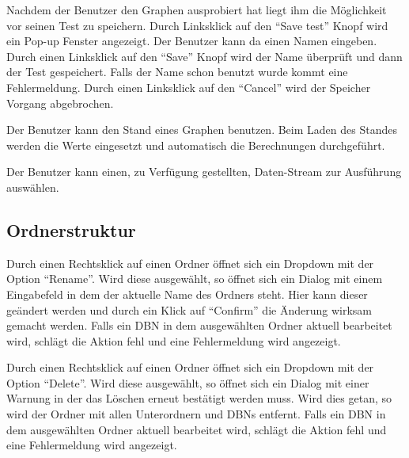\documentclass[parskip=full,11pt,twoside]{scrartcl}
\begin{document}

Nachdem der Benutzer den Graphen ausprobiert hat liegt ihm die Möglichkeit vor seinen Test zu speichern.
Durch Linksklick auf den \enquote{Save test} Knopf wird ein Pop-up Fenster angezeigt. Der Benutzer kann da einen Namen eingeben. 
Durch einen Linksklick auf den \enquote{Save} Knopf wird der Name überprüft und dann der Test gespeichert.
Falls der Name schon benutzt wurde kommt eine Fehlermeldung.
Durch einen Linksklick auf den \enquote{Cancel} wird der Speicher Vorgang abgebrochen.


Der Benutzer kann den Stand eines Graphen benutzen. Beim Laden des Standes werden die Werte eingesetzt und automatisch die
Berechnungen durchgeführt.


Der Benutzer kann einen, zu Verfügung gestellten, Daten-Stream zur Ausführung auswählen.

\subsection{Ordnerstruktur}


Durch einen Rechtsklick auf einen Ordner öffnet sich ein Dropdown mit der Option \enquote{Rename}. Wird diese ausgewählt, so öffnet sich ein Dialog mit einem Eingabefeld in dem der aktuelle Name des Ordners steht. Hier kann dieser geändert werden und durch ein Klick auf \enquote{Confirm} die Änderung wirksam gemacht werden.
Falls ein DBN in dem ausgewählten Ordner aktuell bearbeitet wird, schlägt die Aktion fehl und eine Fehlermeldung wird angezeigt.


Durch einen Rechtsklick auf einen Ordner öffnet sich ein Dropdown mit der Option \enquote{Delete}. Wird diese ausgewählt, so öffnet sich ein Dialog mit einer Warnung in der das Löschen erneut bestätigt werden muss. Wird dies getan, so wird der Ordner mit allen Unterordnern und DBNs entfernt.
Falls ein DBN in dem ausgewählten Ordner aktuell bearbeitet wird, schlägt die Aktion fehl und eine Fehlermeldung wird angezeigt.

\end{document}
